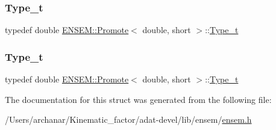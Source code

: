 \mbox{\label{structENSEM_1_1Promote_3_01double_00_01short_01_4_add06e396481b481fe69ed962df8e530a}} 
\subsubsection{\texorpdfstring{Type\_t}{Type\_t}\hspace{0.1cm}{\footnotesize\ttfamily [2/3]}}
{\footnotesize\ttfamily typedef double \mbox{\hyperlink{structENSEM_1_1Promote}{E\+N\+S\+E\+M\+::\+Promote}}$<$ double, short $>$\+::\mbox{\hyperlink{structENSEM_1_1Promote_3_01double_00_01short_01_4_add06e396481b481fe69ed962df8e530a}{Type\+\_\+t}}}

\mbox{\label{structENSEM_1_1Promote_3_01double_00_01short_01_4_add06e396481b481fe69ed962df8e530a}} 
\subsubsection{\texorpdfstring{Type\_t}{Type\_t}\hspace{0.1cm}{\footnotesize\ttfamily [3/3]}}
{\footnotesize\ttfamily typedef double \mbox{\hyperlink{structENSEM_1_1Promote}{E\+N\+S\+E\+M\+::\+Promote}}$<$ double, short $>$\+::\mbox{\hyperlink{structENSEM_1_1Promote_3_01double_00_01short_01_4_add06e396481b481fe69ed962df8e530a}{Type\+\_\+t}}}



The documentation for this struct was generated from the following file\+:\begin{DoxyCompactItemize}
\item 
/\+Users/archanar/\+Kinematic\+\_\+factor/adat-\/devel/lib/ensem/\mbox{\hyperlink{adat-devel_2lib_2ensem_2ensem_8h}{ensem.\+h}}\end{DoxyCompactItemize}
